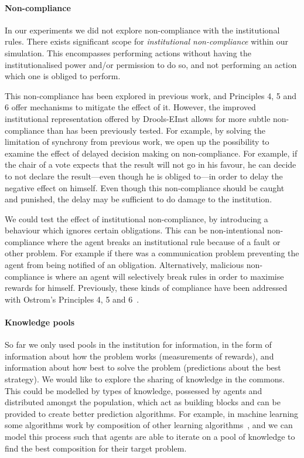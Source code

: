 \paragraph{Non-compliance} 
In our experiments we did not explore non-compliance with the institutional rules.
There exists significant scope for \emph{institutional non-compliance} within our
simulation. This encompasses performing actions without having the institutionalised
power and/or permission to do so, and not performing an action which one is
obliged to perform.

This non-compliance has been explored in previous work, and Principles
4, 5 and 6 offer mechanisms to mitigate the effect of it. However, the
improved institutional representation offered by Drools-EInst allows for more
subtle non-compliance than has been previously tested. For example, by solving
the limitation of synchrony from previous work, we open up the possibility to
examine the effect of delayed decision making on non-compliance. For example,
if the chair of a vote expects that the result will not go in his favour, he
can decide to not declare the result---even though he is obliged to---in order to delay
the negative effect on himself. Even though this non-compliance should be
caught and punished, the delay may be sufficient to do damage to the
institution.

We could test the effect of
institutional non-compliance, by introducing a behaviour which ignores certain
obligations. This can be non-intentional non-compliance where the agent
breaks an institutional rule because of a fault or other problem. For example
if there was a communication problem preventing the agent from being notified of
an obligation. Alternatively, malicious non-compliance is where an agent will
selectively break rules in order to maximise rewards for himself. Previously,
these kinds of compliance have been addressed with Ostrom's Principles 4, 5 and
6~\citep{Pitt2012b}. 

\paragraph{Knowledge pools} So far we only used pools in the institution for
information, in the form of information about how the problem works
(measurements of rewards), and information about how best to solve the problem
(predictions about the best strategy). We would like to explore the sharing of
knowledge in the commons. This could be modelled by types of knowledge,
possessed by agents and distributed amongst the population, which act as
building blocks and can be provided to create better prediction algorithms.
For example, in machine learning some algorithms work by composition of other
learning algorithms~\citep{Opitz1999}, and we can model this process such
that agents are able to iterate on a pool of knowledge to find the best
composition for their target problem.

